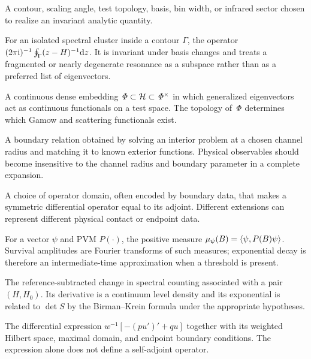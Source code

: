 \begin{description}[style=nextline]
  \item[Representation datum.] A contour, scaling angle, test topology,
  basis, bin width, or infrared sector chosen to realize an invariant analytic
  quantity.

  \item[Riesz projection.]
  For an isolated spectral cluster inside a contour $\Gamma$, the operator
  $(2\pi\mathrm{i})^{-1}\oint_\Gamma(z-H)^{-1}\mathrm{d} z$.  It is invariant under
  basis changes and treats a fragmented or nearly degenerate resonance as a
  subspace rather than as a preferred list of eigenvectors.

  \item[Rigged Hilbert space.]
  A continuous dense embedding $\mathit{\Phi}\subset\mathcal{H}\subset\mathit{\Phi}^\times$
  in which generalized eigenvectors act as continuous functionals on a test
  space.  The topology of $\mathit{\Phi}$ determines which Gamow and scattering
  functionals exist.

  \item[$R$-matrix.]
  A boundary relation obtained by solving an interior problem at a chosen
  channel radius and matching it to known exterior functions.  Physical
  observables should become insensitive to the channel radius and boundary
  parameter in a complete expansion.

  \item[Self-adjoint extension.]
  A choice of operator domain, often encoded by boundary data, that makes a
  symmetric differential operator equal to its adjoint.  Different
  extensions can represent different physical contact or endpoint data.

  \item[Spectral measure.]
  For a vector $\psi$ and PVM $P(\cdot)$, the positive measure
  $\mu_\psi(B)=\langle \psi,P(B)\psi\rangle$.  Survival amplitudes are Fourier
  transforms of such measures; exponential decay is therefore an
  intermediate-time approximation when a threshold is present.

  \item[Spectral shift.]
  The reference-subtracted change in spectral counting associated with a
  pair $(H,H_0)$.  Its derivative is a continuum level density and its
  exponential is related to $\det S$ by the Birman--Krein formula under the
  appropriate hypotheses.

  \item[Sturm--Liouville operator.]
  The differential expression
  $w^{-1}[-(pu')'+qu]$ together with its weighted Hilbert space, maximal
  domain, and endpoint boundary conditions.  The expression alone does not
  define a self-adjoint operator.


\end{description}

